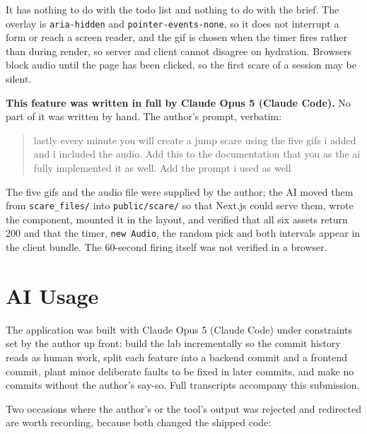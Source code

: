 \documentclass[11pt,a4paper]{article}
\begin{document}
It has nothing to do with the todo list and nothing to do with the brief. The
overlay is \texttt{aria-hidden} and \texttt{pointer-events-none}, so it does not
interrupt a form or reach a screen reader, and the gif is chosen when the timer
fires rather than during render, so server and client cannot disagree on
hydration. Browsers block audio until the page has been clicked, so the first
scare of a session may be silent.

\textbf{This feature was written in full by Claude Opus 5 (Claude Code).} No part
of it was written by hand. The author's prompt, verbatim:

\begin{quote}
lastly every minute you will create a jump scare using the five gifs i added and
i included the audio. Add this to the documentation that you as the ai fully
implemented it as well. Add the prompt i used as well
\end{quote}

The five gifs and the audio file were supplied by the author; the AI moved them
from \texttt{scare\_files/} into \texttt{public/scare/} so that Next.js could
serve them, wrote the component, mounted it in the layout, and verified that all
six assets return 200 and that the timer, \texttt{new Audio}, the random pick and
both intervals appear in the client bundle. The 60-second firing itself was not
verified in a browser.

\section{AI Usage}

The application was built with Claude Opus 5 (Claude Code) under constraints set
by the author up front: build the lab incrementally so the commit history reads
as human work, split each feature into a backend commit and a frontend commit,
plant minor deliberate faults to be fixed in later commits, and make no commits
without the author's say-so. Full transcripts accompany this submission.

Two occasions where the author's or the tool's output was rejected and redirected
are worth recording, because both changed the shipped code:
\end{document}
